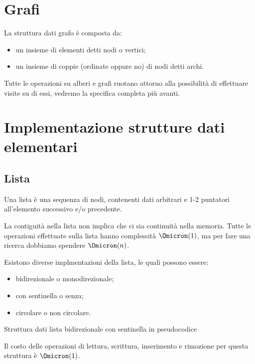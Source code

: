 \section{Grafi}

La struttura dati grafo è composta da:
\begin{itemize}
	\item un insieme di elementi detti nodi o vertici;
	\item un insieme di coppie (ordinate oppure no) di nodi detti archi.
\end{itemize}

Tutte le operazioni su alberi e grafi ruotano attorno alla possibilità di effettuare visite su di essi, vedremo la specifica completa più avanti.

\clearpage
\section{Implementazione strutture dati elementari}

\subsection{Lista}

Una lista è una sequenza di nodi, contenenti dati arbitrari e 1-2 puntatori all'elemento successivo e/o precedente.

La contiguità nella lista non implica che ci sia continuità nella memoria.
Tutte le operazioni effettuate sulla lista hanno complessità \(\Omicron(1)\), ma per fare una ricerca dobbiamo spendere \(\Omicron(n)\).

Esistono diverse implmentazioni della lista, le quali possono essere:
\begin{itemize}
	\item bidirezionale o monodirezionale;
	\item con sentinella o senza;
	\item circolare o non circolare.
\end{itemize}


\begin{algorithm}[H]
	\caption{Struttura dati lista bidirezionale con sentinella in pseudocodice}
	
\end{algorithm}

Il costo delle operazioni di lettura, scrittura, inserimento e rimozione per questa struttura è \(\Omicron(1)\).

